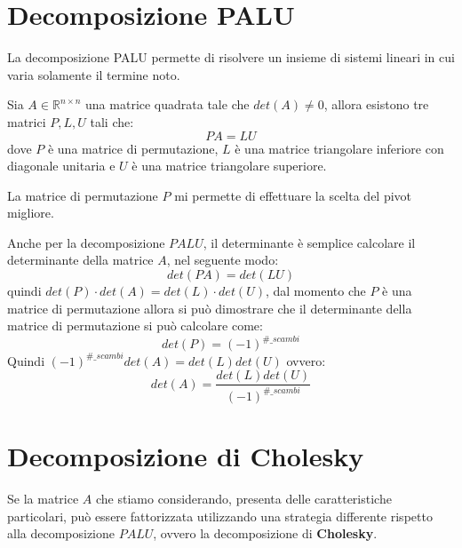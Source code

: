 \section{Decomposizione PALU}
La decomposizione PALU permette di risolvere un insieme di sistemi lineari in
cui varia solamente il termine noto.
\begin{teorema}
    Sia $A \in \mathbb{R}^{n\times n}$ una matrice quadrata tale che $det(A) \neq 0$,
    allora esistono tre matrici $P,L,U$ tali che:
    \begin{equation}
        PA=LU
    \end{equation}
    dove $P$ è una matrice di permutazione, $L$ è una matrice triangolare inferiore
    con diagonale unitaria e $U$ è una matrice triangolare superiore.
\end{teorema}
La matrice di permutazione $P$ mi permette di effettuare la scelta del pivot migliore.
\begin{nota}
    Anche per la decomposizione $PALU$, il determinante è semplice calcolare
    il determinante della matrice $A$, nel seguente modo:
    \begin{equation*}
        det(PA) = det(LU)
    \end{equation*}
    quindi $det(P) \cdot det(A) = det(L) \cdot det(U)$, dal momento che $P$ è
    una matrice di permutazione allora si può dimostrare che il determinante della
    matrice di permutazione si può calcolare come:
    \begin{equation*}
        det(P) = (-1)^{\#\_scambi}
    \end{equation*}
    Quindi $(-1)^{\#\_scambi}det(A) = det(L)det(U)$ ovvero:
    \begin{equation*}
        det(A) = \frac{det(L)det(U)}{(-1)^{\#\_scambi}}
    \end{equation*}
\end{nota}
\section{Decomposizione di Cholesky}
Se la matrice $A$ che stiamo considerando, presenta delle caratteristiche
particolari, può essere fattorizzata utilizzando una strategia differente
rispetto alla decomposizione $PALU$, ovvero la decomposizione di \textbf{Cholesky}.

